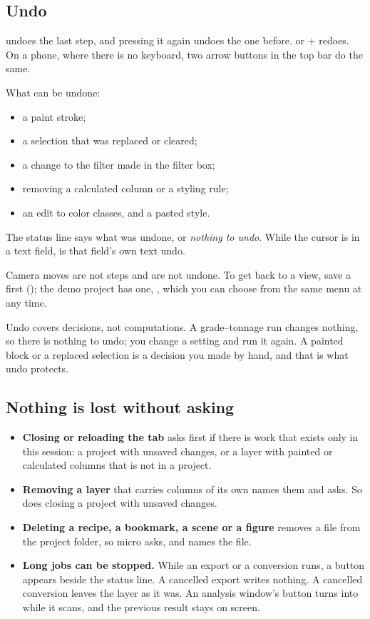 \subsection{Undo}
 undoes the last step, and pressing it again undoes the one before.  or + redoes. On a phone, where there is no keyboard, two arrow buttons in the top bar do the same.

What can be undone:

\begin{itemize}
\item a paint stroke;
\item a selection that was replaced or cleared;
\item a change to the filter made in the filter box;
\item removing a calculated column or a styling rule;
\item an edit to color classes, and a pasted style.
\end{itemize}

The status line says what was undone, or \emph{nothing to undo}. While the cursor is in a text field,  is that field's own text undo.

Camera moves are not steps and are not undone. To get back to a view, save a  first (); the demo project has one, , which you can choose from the same menu at any time.

\begin{why}
Undo covers decisions, not computations. A grade–tonnage run changes nothing, so there is nothing to undo; you change a setting and run it again. A painted block or a replaced selection is a decision you made by hand, and that is what undo protects.
\end{why}

\subsection{Nothing is lost without asking}
\begin{itemize}
\item \textbf{Closing or reloading the tab} asks first if there is work that exists only in this session: a project with unsaved changes, or a layer with painted or calculated columns that is not in a project.
\item \textbf{Removing a layer} that carries columns of its own names them and asks. So does closing a project with unsaved changes.
\item \textbf{Deleting a recipe, a bookmark, a scene or a figure} removes a file from the project folder, so micro asks, and names the file.
\item \textbf{Long jobs can be stopped.} While an export or a conversion runs, a  button appears beside the status line. A cancelled export writes nothing. A cancelled conversion leaves the layer as it was. An analysis window's  button turns into  while it scans, and the previous result stays on screen.
\end{itemize}

